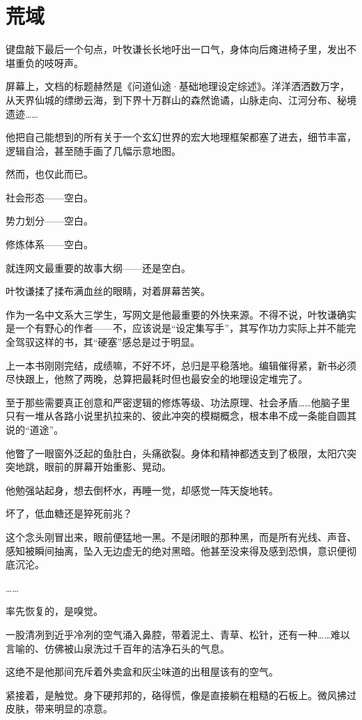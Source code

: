 \chapter{荒域}

键盘敲下最后一个句点，叶牧谦长长地吁出一口气，身体向后瘫进椅子里，发出不堪重负的吱呀声。

屏幕上，文档的标题赫然是《问道仙途·基础地理设定综述》。洋洋洒洒数万字，从天界仙城的缥缈云海，到下界十万群山的森然诡谲，山脉走向、江河分布、秘境遗迹……

他把自己能想到的所有关于一个玄幻世界的宏大地理框架都塞了进去，细节丰富，逻辑自洽，甚至随手画了几幅示意地图。

然而，也仅此而已。

社会形态——空白。

势力划分——空白。

修炼体系——空白。

就连网文最重要的故事大纲——还是空白。

叶牧谦揉了揉布满血丝的眼睛，对着屏幕苦笑。

作为一名中文系大三学生，写网文是他最重要的外快来源。不得不说，叶牧谦确实是一个有野心的作者——不，应该说是“设定集写手”，其写作功力实际上并不能完全驾驭这样的书，其“硬塞”感总是过于明显。

上一本书刚刚完结，成绩嘛，不好不坏，总归是平稳落地。编辑催得紧，新书必须尽快跟上，他熬了两晚，总算把最耗时但也最安全的地理设定堆完了。

至于那些需要真正创意和严密逻辑的修炼等级、功法原理、社会矛盾……他脑子里只有一堆从各路小说里扒拉来的、彼此冲突的模糊概念，根本串不成一条能自圆其说的“道途”。

他瞥了一眼窗外泛起的鱼肚白，头痛欲裂。身体和精神都透支到了极限，太阳穴突突地跳，眼前的屏幕开始重影、晃动。

他勉强站起身，想去倒杯水，再睡一觉，却感觉一阵天旋地转。

坏了，低血糖还是猝死前兆？

这个念头刚冒出来，眼前便猛地一黑。不是闭眼的那种黑，而是所有光线、声音、感知被瞬间抽离，坠入无边虚无的绝对黑暗。他甚至没来得及感到恐惧，意识便彻底沉沦。

……

率先恢复的，是嗅觉。

一股清冽到近乎冷冽的空气涌入鼻腔，带着泥土、青草、松针，还有一种……难以言喻的、仿佛被山泉洗过千百年的洁净石头的气息。

这绝不是他那间充斥着外卖盒和灰尘味道的出租屋该有的空气。

紧接着，是触觉。身下硬邦邦的，硌得慌，像是直接躺在粗糙的石板上。微风拂过皮肤，带来明显的凉意。

